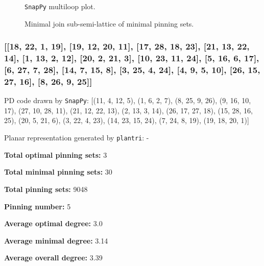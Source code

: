 \documentclass{article}%
\begin{document}
\begin{multicols}{2}
\begin{figure}[H]
\centering

\caption{\texttt{SnapPy} multiloop plot.}
\label{fig:tex/img/[[20, 15, 1, 16], [16, 5, 17, 6], [19, 28, 20, 21], [14, 27, 15, 28], [1, 10, 2, 11], [4, 23, 5, 24], [17, 23, 18, 22], [6, 22, 7, 21], [7, 18, 8, 19], [8, 13, 9, 14], [9, 26, 10, 27], [2, 26, 3, 25],.svg}
\end{figure}
\columnbreak

\begin{figure}[H]
\centering
\scalebox{0.8}{}
\caption{Minimal join sub-semi-lattice of minimal pinning sets.}
\label{fig:tex/img/[[20, 15, 1, 16], [16, 5, 17, 6], [19, 28, 20, 21], [14, 27, 15, 28], [1, 10, 2, 11], [4, 23, 5, 24], [17, 23, 18, 22], [6, 22, 7, 21], [7, 18, 8, 19], [8, 13, 9, 14], [9, 26, 10, 27], [2, 26, 3, 25],.pgf}
\end{figure}
\end{multicols}

\newpage

\subsubsection{[[18, 22, 1, 19], [19, 12, 20, 11], [17, 28, 18, 23], [21, 13, 22, 14], [1, 13, 2, 12], [20, 2, 21, 3], [10, 23, 11, 24], [5, 16, 6, 17], [6, 27, 7, 28], [14, 7, 15, 8], [3, 25, 4, 24], [4, 9, 5, 10], [26, 15, 27, 16], [8, 26, 9, 25]]}

{\small\noindent PD code drawn by \texttt{SnapPy}: [(11, 4, 12, 5), (1, 6, 2, 7), (8, 25, 9, 26), (9, 16, 10, 17), (27, 10, 28, 11), (21, 12, 22, 13), (2, 13, 3, 14), (26, 17, 27, 18), (15, 28, 16, 25), (20, 5, 21, 6), (3, 22, 4, 23), (14, 23, 15, 24), (7, 24, 8, 19), (19, 18, 20, 1)]}

{\small\noindent Planar representation generated by \texttt{plantri}: -}

\begin{multicols}{2}
{\normalsize \noindent\textbf{Total optimal pinning sets:} 3

\noindent\textbf{Total minimal pinning sets:} 30

\noindent\textbf{Total pinning sets:} 9048

\noindent\textbf{Pinning number:} 5

}
\columnbreak

{\normalsize \noindent\textbf{Average optimal degree:} 3.0

\noindent\textbf{Average minimal degree:} 3.14

\noindent\textbf{Average overall degree:} 3.39

}
\end{multicols}
\end{document}
